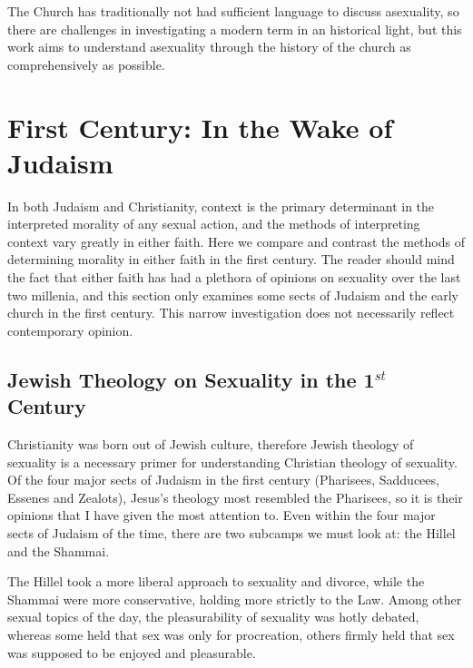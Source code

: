 \documentclass[12pt]{article}
\begin{document}
    \par The Church has traditionally
        not had sufficient language to discuss asexuality, so there 
        are challenges 
        in investigating a modern term in an historical light, but this work 
        aims to understand asexuality through the history of the church as
        comprehensively as possible.

\section{First Century: In the Wake of Judaism}

    In both Judaism and Christianity, context is the primary determinant in 
    the interpreted morality of any sexual action, and the methods of 
    interpreting context vary greatly in either faith. Here we 
    compare and contrast the 
    methods of determining morality in either faith in the first century. The
    reader should mind the fact that either faith has had a plethora 
    of opinions on sexuality over the last two millenia, and this 
    section only examines some sects of Judaism and the early church in 
    the first century. This narrow investigation does not necessarily 
    reflect contemporary opinion.

\subsection{Jewish Theology on Sexuality in the 1$^{st}$ Century}
    \par Christianity was born out of Jewish culture, therefore Jewish theology
        of sexuality is a necessary primer for understanding Christian theology
        of sexuality. Of the four major sects of Judaism in the first century
        (Pharisees, Sadducees, Essenes and Zealots), Jesus's theology most
        resembled the Pharisees\cite{finkelstein_1929}, so it is their 
        opinions that I have given the most attention to.
        Even within the four major sects of Judaism of the time, there are two
        subcamps we must look at: the Hillel and the Shammai\cite{sprinkle_2016}.

    \par The Hillel took a more liberal approach to sexuality and divorce,
        while the Shammai were more conservative, holding more strictly to
        the Law. Among other sexual topics of the day, the pleasurability of
        sexuality was hotly debated, whereas some held that sex was only
        for procreation, others firmly held that sex was supposed to be
        enjoyed and pleasurable. 
\end{document}
